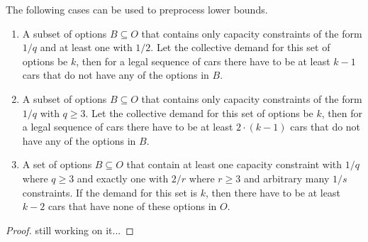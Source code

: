 \documentclass[]{llncs}
\begin{document}
\begin{proposition}
    The following cases can be used to preprocess lower bounds. 
\begin{enumerate}
    \item A subset of options $B\subseteq O$ that contains only  capacity constraints of the form $1/q$ and at least one
        with $1/2$. Let the collective demand for this set of options be $k$, then for a legal sequence of cars there
        have to be at least $k-1$ cars that do not have any of the options in $B$. 
    \item A subset of options $B\subseteq O$ that contains only capacity constraints of the form $1/q$ with $q \geq 3$.
        Let the collective demand for this set of options be $k$, then for a legal sequence of cars there have to be at
        least $2\cdot (k-1)$ cars that do not have any of the options in $B$. 
    \item A set of options $B\subseteq O$ that contain at least one capacity constraint with $1/q$ where $q \geq 3$ and
        exactly one with $2/r$ where $r \geq 3$ and arbitrary many $1/s$ constraints. If the demand for this set is $k$,
        then there have to be at least $k-2$ cars that have none of these options in $O$. 
\end{enumerate}

\end{proposition}

\begin{proof}
    still working on it...
\end{proof}
\end{document}
